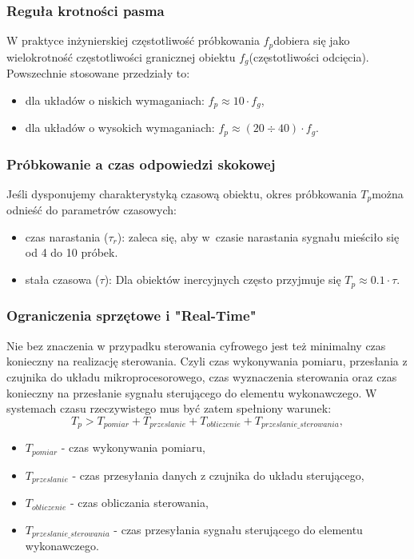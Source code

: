\documentclass{article}
\begin{document}
        \subsubsection{Reguła krotności pasma}
        W praktyce inżynierskiej częstotliwość próbkowania
        $f_p$​ dobiera się jako wielokrotność częstotliwości granicznej
        obiektu $f_g$​ (częstotliwości odcięcia). Powszechnie stosowane
        przedziały to:
        \begin{itemize}
            \item dla układów o niskich wymaganiach: $f_p \approx 10 \cdot f_g$,
            \item dla układów o wysokich wymaganiach: $f_p \approx (20\div40) \cdot f_g$.
        \end{itemize}

        \subsubsection{Próbkowanie a czas odpowiedzi skokowej}
        Jeśli dysponujemy charakterystyką czasową obiektu, okres
        próbkowania $T_p$​ można odnieść do parametrów czasowych:
        \begin{itemize}
            \item czas narastania ($\tau_r$): zaleca się, aby
            w~czasie narastania sygnału mieściło się od 4 do 10 próbek.
            \item stała czasowa ($\tau$): Dla obiektów inercyjnych często przyjmuje się $T_p \approx 0.1 \cdot \tau$.
        \end{itemize}

        \subsubsection{Ograniczenia sprzętowe i "Real-Time"}
        Nie bez znaczenia w przypadku sterowania cyfrowego jest
        też minimalny czas konieczny na realizację sterowania.
        Czyli czas wykonywania pomiaru, przesłania z czujnika do
        układu mikroprocesorowego, czas wyznaczenia sterowania oraz
        czas konieczny na przesłanie sygnału sterującego do elementu
        wykonawczego.
        W systemach czasu rzeczywistego mus być zatem spełniony warunek:
        $$
            T_p > T_{pomiar} + T_{przeslanie} + T_{obliczenie} + T_{przeslanie\_sterowania},
        $$
        \begin{itemize}
            \item $T_{pomiar}$ - czas wykonywania pomiaru,
            \item $T_{przeslanie}$ - czas przesyłania danych z czujnika do układu sterującego,
            \item $T_{obliczenie}$ - czas obliczania sterowania,
            \item $T_{przeslanie\_sterowania}$ - czas przesyłania sygnału sterującego do elementu wykonawczego.
        \end{itemize}
\end{document}
